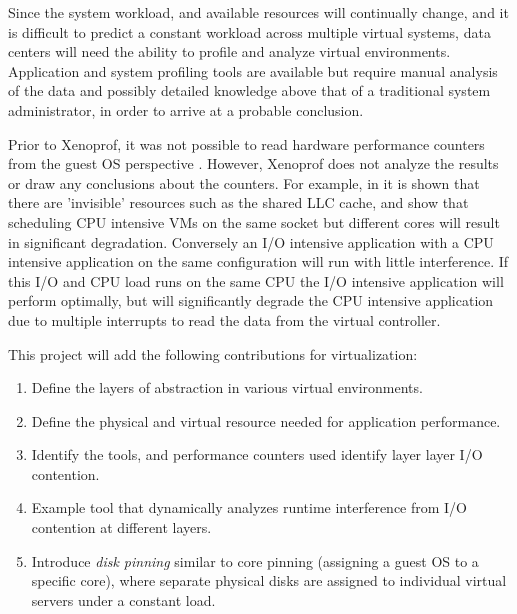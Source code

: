 Since the system workload, and available resources will continually change, and it is difficult to predict a constant workload across multiple virtual systems, data centers will need the ability to profile and analyze virtual environments.  Application and system profiling tools are available but require manual analysis of the data and possibly detailed knowledge above that of a traditional system administrator, in order to arrive at a probable conclusion.   

\indent Prior to Xenoprof, it was not possible to read hardware performance counters from the guest OS perspective \cite{menon, du2}.  However, Xenoprof does not analyze the results or draw any conclusions about the counters.  For example, in \cite{tickoo} it is shown that there are 'invisible' resources such as the shared LLC cache, and show that scheduling CPU intensive VMs on the same socket but different cores will result in significant degradation.  Conversely an I/O intensive application with a CPU intensive application on the same configuration will run with little interference.  If this I/O and CPU load runs on the same CPU the I/O intensive application will perform optimally, but will significantly degrade the CPU intensive application due to multiple interrupts to read the data from the virtual controller.

\indent This project will add the following contributions for virtualization:
\begin{enumerate}
\item Define the layers of abstraction in various virtual environments.
\item Define the physical and virtual resource needed for application performance.
\item Identify the tools, and performance counters used identify layer layer I/O contention.
\item Example tool that dynamically analyzes runtime interference from I/O contention at different layers.
\item Introduce \emph{disk pinning} similar to core pinning (assigning a guest OS to a specific core), where separate physical disks are assigned to individual virtual servers under a constant load.  
\end{enumerate}

